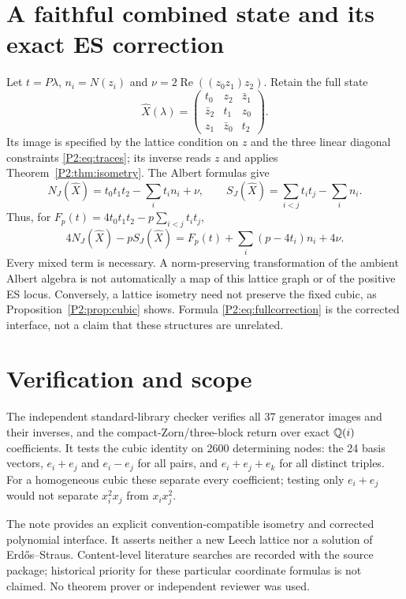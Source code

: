 \section{A faithful combined state and its exact ES correction}
Let $t=P\lambda$, $n_i=N(z_i)$ and $\nu=2\operatorname{Re}((z_0z_1)z_2)$. Retain the full state
\[
\widehat X(\lambda)=\begin{pmatrix}t_0&z_2&\bar z_1\\\bar z_2&t_1&z_0\\z_1&\bar z_0&t_2\end{pmatrix}.
\]
Its image is specified by the lattice condition on $z$ and the three linear diagonal constraints \eqref{P2:eq:traces}; its inverse reads $z$ and applies Theorem~\ref{P2:thm:isometry}. The Albert formulas give
\[
N_J(\widehat X)=t_0t_1t_2-\sum_i t_in_i+\nu,
\qquad S_J(\widehat X)=\sum_{i<j}t_it_j-\sum_i n_i.
\]
Thus, for $F_p(t)=4t_0t_1t_2-p\sum_{i<j}t_it_j$,
\begin{equation}\label{P2:eq:fullcorrection}
\boxed{4N_J(\widehat X)-pS_J(\widehat X)
=F_p(t)+\sum_i(p-4t_i)n_i+4\nu.}
\end{equation}
Every mixed term is necessary. A norm-preserving transformation of the ambient Albert algebra is not automatically a map of this lattice graph or of the positive ES locus. Conversely, a lattice isometry need not preserve the fixed cubic, as Proposition~\ref{P2:prop:cubic} shows. Formula \eqref{P2:eq:fullcorrection} is the corrected interface, not a claim that these structures are unrelated.

\section{Verification and scope}
The independent standard-library checker verifies all 37 generator images and their inverses, and the compact-Zorn/three-block return over exact $\mathbb Q(i)$ coefficients. It tests the cubic identity on 2600 determining nodes: the 24 basis vectors, $e_i+e_j$ and $e_i-e_j$ for all pairs, and $e_i+e_j+e_k$ for all distinct triples. For a homogeneous cubic these separate every coefficient; testing only $e_i+e_j$ would not separate $x_i^2x_j$ from $x_ix_j^2$.

The note provides an explicit convention-compatible isometry and corrected polynomial interface. It asserts neither a new Leech lattice nor a solution of Erd\H{o}s--Straus. Content-level literature searches are recorded with the source package; historical priority for these particular coordinate formulas is not claimed. No theorem prover or independent reviewer was used.

